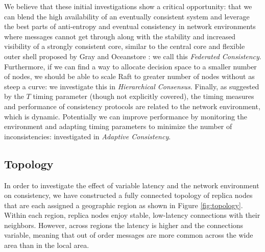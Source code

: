 \documentclass{article}
\begin{document}
We believe that these initial investigations show a critical opportunity: that we can blend the high availability of an eventually consistent system and leverage the best parts of anti-entropy and eventual consistency in network environments where messages cannot get through along with the stability and increased visibility of a strongly consistent core, similar to the central core and flexible outer shell proposed by Gray and Oceanstore \cite{gray_dangers_1996,kubiatowicz_oceanstore:_2000}: we call this \textit{Federated Consistency}. Furthermore, if we can find a way to allocate decision space to a smaller number of nodes, we should be able to scale Raft to greater number of nodes without as steep a curve: we investigate this in \textit{Hierarchical Consensus}. Finally, as suggested by the $T$ timing parameter (though not explicitly covered), the timing measures and performance of consistency protocols are related to the network environment, which is dynamic. Potentially we can improve performance by monitoring the environment and adapting timing parameters to minimize the number of inconsistencies: investigated in \textit{Adaptive Consistency}.

\subsection{Topology}

In order to investigate the effect of variable latency and the network environment on consistency, we have constructed a fully connected topology of replica nodes that are each assigned a geographic region as shown in Figure \ref{fig:topology}. Within each region, replica nodes enjoy stable, low-latency connections with their neighbors. However, across regions the latency is higher and the connections variable, meaning that out of order messages are more common across the wide area than in the local area.
\end{document}
